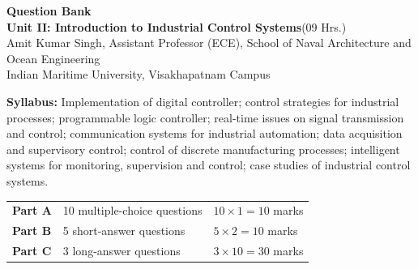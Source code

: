 \documentclass[11pt,a4paper]{article}
\begin{document}
	\begin{center}
		{\Large\bfseries\color{cAccent} Question Bank}\\[4pt]
		{\large\bfseries Unit II: Introduction to Industrial Control Systems}\quad(09 Hrs.)\\[6pt]
		{\small Amit Kumar Singh, Assistant Professor (ECE), School of Naval Architecture and Ocean Engineering\\
			Indian Maritime University, Visakhapatnam Campus}
	\end{center}

	\noindent\textbf{Syllabus:} Implementation of digital controller; control strategies for industrial processes; programmable logic controller; real-time issues on signal transmission and control; communication systems for industrial automation; data acquisition and supervisory control; control of discrete manufacturing processes; intelligent systems for monitoring, supervision and control; case studies of industrial control systems.

	\medskip
	\noindent
	\begin{tabular}{@{}lll@{}}
		\textbf{Part A} & 10 multiple-choice questions & $10\times1 = 10$ marks \\
		\textbf{Part B} & 5 short-answer questions      & $5\times2 = 10$ marks \\
		\textbf{Part C} & 3 long-answer questions       & $3\times10 = 30$ marks \\
	\end{tabular}
\end{document}
